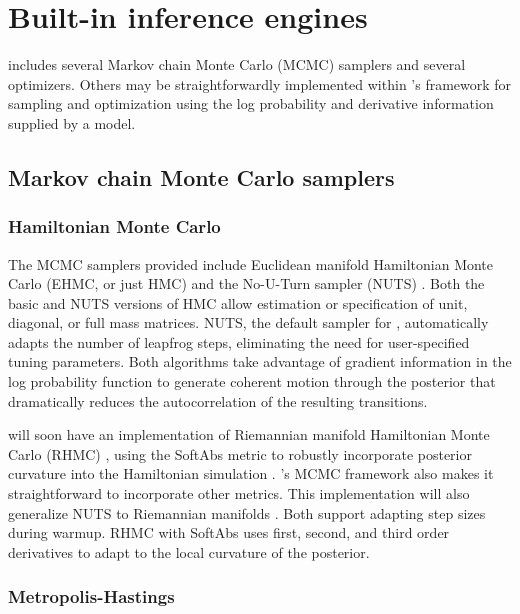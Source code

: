 \documentclass[article]{jss}
\begin{document}
\section{Built-in inference engines}\label{inference-engines.section}

 includes several Markov chain Monte Carlo (MCMC)
samplers and several optimizers.  Others may be straightforwardly
implemented within 's  framework for
sampling and optimization using the log probability and derivative
information supplied by a model.

\subsection{Markov chain Monte Carlo samplers}

\subsubsection{Hamiltonian Monte Carlo}

The MCMC samplers provided include Euclidean manifold Hamiltonian
Monte Carlo (EHMC, or just HMC) \citep{DuaneEtAl:1987, Neal:1994,
  Neal:2011} and the No-U-Turn sampler (NUTS)
\citep{HoffmanGelman:2011}.  Both the basic and NUTS versions of HMC
allow estimation or specification of unit, diagonal, or full mass
matrices.  NUTS, the default sampler for ,
automatically adapts the number of leapfrog steps, eliminating the
need for user-specified tuning parameters.  Both algorithms take
advantage of gradient information in the log probability function to
generate coherent motion through the posterior that dramatically
reduces the autocorrelation of the resulting transitions.

 will soon have an implementation of Riemannian
manifold Hamiltonian Monte Carlo (RHMC)
\citep{GirolamiCalderhead:2011}, using the SoftAbs metric to robustly
incorporate posterior curvature into the Hamiltonian simulation
\cite{Betancourt:2012}.  's MCMC framework also makes
it straightforward to incorporate other metrics.  This implementation
will also generalize NUTS to Riemannian manifolds
\citep{Betancourt:2013}.  Both support adapting step sizes during
warmup.  RHMC with SoftAbs uses first, second, and third order
derivatives to adapt to the local curvature of the posterior.

\subsubsection{Metropolis-Hastings}
\end{document}
